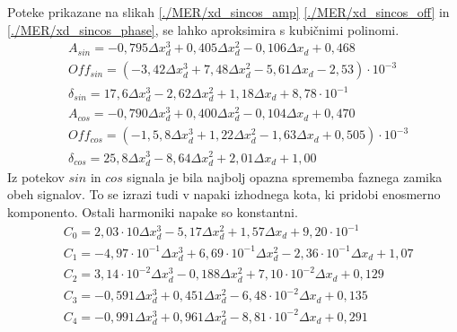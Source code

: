 Poteke prikazane na slikah \ref{./MER/xd_sincos_amp} \ref{./MER/xd_sincos_off} in \ref{./MER/xd_sincos_phase}, se lahko aproksimira s kubičnimi polinomi.
\begin{eqnarray}
&A_{sin}=-0,795\Delta x_d^3+0,405\Delta x_d^2-0,106\Delta x_d+0,468\\
&Off_{sin}=(-3,42\Delta x_d^3+7,48\Delta x_d^2-5,61\Delta x_d-2,53) \cdot 10^{-3}\\
&\delta_{sin}=17,6\Delta x_d^3-2,62\Delta x_d^2+1,18\Delta x_d+8,78\cdot10^{-1}\\
&A_{cos}=-0,790\Delta x_d^3+0,400\Delta x_d^2-0,104\Delta x_d+0,470\\
&Off_{cos}=(-1,5,8\Delta x_d^3+1,22\Delta x_d^2-1,63\Delta x_d+0,505) \cdot 10^{-3}\\
&\delta_{cos}=25,8\Delta x_d^3-8,64\Delta x_d^2+2,01\Delta x_d+1,00
\end{eqnarray}
Iz potekov $sin$ in $cos$ signala je bila najbolj opazna sprememba faznega zamika obeh signalov. To se izrazi tudi v napaki izhodnega kota, ki pridobi enosmerno komponento. Ostali harmoniki napake so konstantni.
\begin{eqnarray}
&C_0 =2,03\cdot 10\Delta x_d^{3}-5,17\Delta x_d^{2}+1,57\Delta x_d+9,20\cdot 10^{-1} \\                                
&C_1 =-4,97\cdot 10^{-1}\Delta x_d^{3}+6,69\cdot 10^{-1}\Delta x_d^{2}-2,36\cdot 10^{-1}\Delta x_d+1,07 \\             
&C_2 =3,14\cdot 10^{-2}\Delta x_d^{3}-0,188\Delta x_d^{2}+7,10\cdot 10^{-2}\Delta x_d+0,129 \\ 
&C_3 =-0,591\Delta x_d^{3}+0,451\Delta x_d^{2}-6,48\cdot 10^{-2}\Delta x_d+0,135\\
&C_4 =-0,991\Delta x_d^{3}+0,961\Delta x_d^{2}-8,81\cdot 10^{-2}\Delta x_d+0,291
\end{eqnarray}


